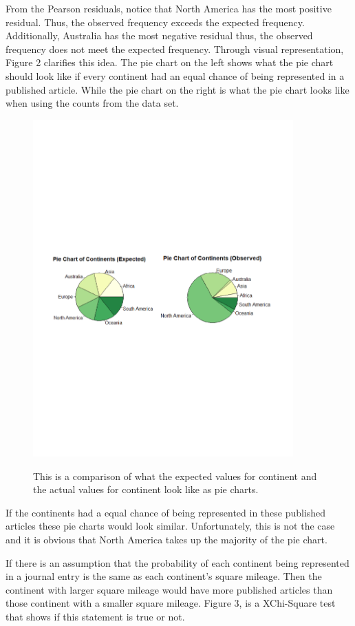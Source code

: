 \documentclass[12pt, letterpaper]{article}
\begin{document}
From the Pearson residuals, notice that North America has the most positive residual. Thus, the observed frequency exceeds the expected frequency. Additionally, Australia has the most negative residual thus, the observed frequency does not meet the expected frequency. Through visual representation, Figure 2 clarifies this idea. The pie chart on the left shows what the pie chart should look like if every continent had an equal chance of being represented in a published article. While the pie chart on the right is what the pie chart looks like when using the counts from the data set. 
\begin{figure}[!h]
\begin{center}
\includegraphics[width=10cm]{ContinentPieChart.pdf}
\label{fig: Continent Pie Chart}
\caption{This is a comparison of what the expected values for continent and the actual values for continent look like as pie charts.}
\end{center}
\end{figure}

If the continents had a equal chance of being represented in these published articles these pie charts would look similar. Unfortunately, this is not the case and it is obvious that North America takes up the majority of the pie chart.

If there is an assumption that the probability of each continent being represented in a journal entry is the same as each continent's square mileage. Then the continent with larger square mileage would have more published articles than those continent with a smaller square mileage. Figure 3, is a XChi-Square test that shows if this statement is true or not.
 
\end{document}
